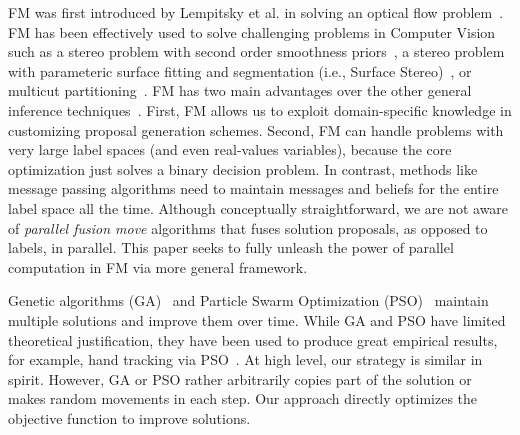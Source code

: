 
\noindent FM was first introduced by Lempitsky et al. in solving an
optical flow problem~\cite{first_fusion_viktor}. FM has been effectively
used to solve challenging problems in Computer Vision such as a stereo
problem with second order smoothness priors~\cite{woodford}, a stereo
problem with parameteric surface fitting and segmentation (i.e., Surface
Stereo)~\cite{surface_stereo}, or multicut
partitioning~\cite{fusionmovesforcorrelationclustering}.
%
FM has two main advantages over the other general inference
techniques~\cite{trw,loopy_belief_propagation}. First, FM allows us to
exploit domain-specific knowledge in customizing proposal generation
schemes. Second, FM can handle problems with very large label spaces
(and even real-values variables), because the core optimization just
solves a binary decision problem.
%
In contrast, methods like message passing algorithms need to maintain
messages and beliefs for the entire label space all the time.
%
Although conceptually straightforward, we are not aware of {\it parallel
fusion move} algorithms that fuses solution proposals, as opposed to
labels, in parallel. This paper seeks to fully unleash the power of
parallel computation in FM via more general framework.



\noindent
Genetic algorithms (GA)~\cite{ga} and Particle Swarm
Optimization (PSO)~\cite{pso} maintain multiple solutions and improve
them over time.
%
While GA and PSO have limited theoretical justification, they have been
used to produce great empirical results, for example, hand tracking via
PSO~\cite{pushmeet_hand_tracking}. At high level, our strategy is
similar in spirit. However, GA or PSO rather arbitrarily copies part of
the solution or makes random movements in each step. Our approach
directly optimizes the objective function to improve solutions.


